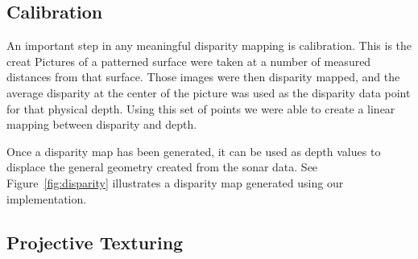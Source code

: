 \documentclass[a4paper,twoside]{article}
\begin{document}





\subsection{Calibration}
\label{subsec:calibration}

An important step in any meaningful disparity mapping is calibration.
This is the creat
Pictures of a patterned surface were taken at a number of measured distances from that surface.
Those images were then disparity mapped, and the average disparity at the center of the picture was used as the disparity data point for that physical depth.
Using this set of points we were able to create a linear mapping between disparity and depth.


Once a disparity map has been generated, it can be used as depth values to displace the general geometry created from the sonar data. See Figure~\ref{fig:disparity} illustrates a disparity map generated using our implementation.


\subsection{Projective Texturing}
\label{subsec:projectiveTexturing}
\end{document}
